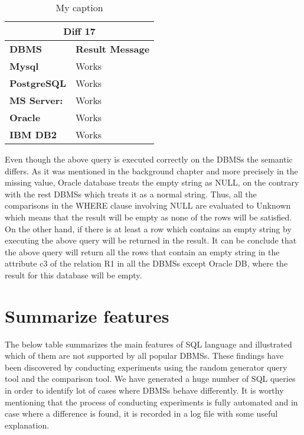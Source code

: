  
\begin{table}[h]
\centering
\caption{My caption}
\label{my-label}
\begin{tabular}{|p{2cm}|p{12cm}|}
\hline
\multicolumn{2}{|c|}{\textbf{Diff 17}}                                    \\ \hline
\textbf{DBMS}                              & \textbf{Result Message}      \\ \hline
{\color[HTML]{333333} \textbf{Mysql}}      & {\color[HTML]{333333} Works} \\ \hline
{\color[HTML]{333333} \textbf{PostgreSQL}} & {\color[HTML]{333333} Works} \\ \hline
{\color[HTML]{333333} \textbf{MS Server:}} & {\color[HTML]{333333} Works} \\ \hline
\textbf{Oracle}                            & Works                        \\ \hline
\textbf{IBM DB2}                           & Works                        \\ \hline
\end{tabular}
\end{table}


Even though the above query is executed correctly on the DBMSs the semantic differs. As it was mentioned in the background chapter and more precisely in the missing value, Oracle database treats the empty string as NULL, on the contrary with the rest DBMSs which treats it as a normal string. Thus, all the comparisons in the WHERE clause involving NULL are evaluated to Unknown which means that the result will be empty as none of the rows will be satisfied.  On the other hand, if there is at least a row which contains an empty string by executing the above query will be returned in the result. It can be conclude that the above query will return all the rows that contain an empty string in the attribute c3 of the relation R1 in all the DBMSs except Oracle DB, where the result for this database will be empty.


\section{Summarize features}
The below table summarizes the main features of SQL language and illustrated which of them are not supported by all popular DBMSs. These findings have been discovered by conducting experiments using the random generator query tool and the comparison tool. We have generated a huge number of SQL queries in order to identify lot of cases where DBMSs behave differently. It is worthy mentioning that the process of conducting experiments is fully automated and in case where a difference is found, it is recorded in a log file with some useful explanation.    



